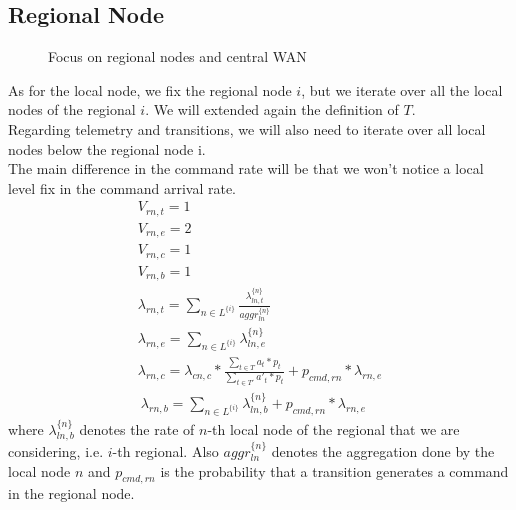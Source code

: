 \documentclass[11pt]{article}
\begin{document}
\subsection{Regional Node}
\begin{figure}[H]
	\centering
	\hspace*{-3.7cm}
	\frame{}
	\caption{Focus on regional nodes and central WAN}
\end{figure}
As for the local node, we fix the regional node $i$, but we iterate over all the local nodes of the regional $i$. We will extended again the definition of $T$.\\
Regarding telemetry and transitions, we will also need to iterate over all local nodes below the regional node i.\\
The main difference in the command rate will be that we won't notice a local level fix in the command arrival rate.
\begin{equation}
	\begin{array}{l}
		V_{rn, t} = 1 \\
		V_{rn, e} = 2 \\ %
		V_{rn, c} = 1 \\
		V_{rn, b} = 1 \\
        \lambda_{rn, t} = \sum\limits_{n \in L^{\{i\}}}{\frac{\lambda^{\{n\}}_{ln, t}}{aggr^{\{n\}}_{ln}}}  \\
        \lambda_{rn, e} = \sum\limits_{n \in L^{\{i\}}}{\lambda^{\{n\}}_{ln, e}} \\
		\lambda_{rn, c} = \lambda_{cn, c} * \frac{\sum\limits_{t \in T}{a_{t} * p_{t}}}{\sum\limits_{t \in T'}{a'_{t} * p_{t}}} + p_{cmd,rn} * \lambda_{rn, e} \\\
        \lambda_{rn, b} = \sum\limits_{n \in L^{\{ i \}}}{\lambda^{\{ n \}}_{ln, b}} + p_{cmd, rn} * \lambda_{rn,e}

	\end{array}
\end{equation}
where $\lambda^{\{ n \}}_{ln, b}$ denotes the rate of $n$-th local node of the regional that we are considering, i.e. $i$-th regional. Also $aggr^{\{n\}}_{ln}$ denotes the aggregation done by the local node $n$ and $p_{cmd, rn}$ is the probability that a transition generates a command in the regional node. \\
\end{document}
